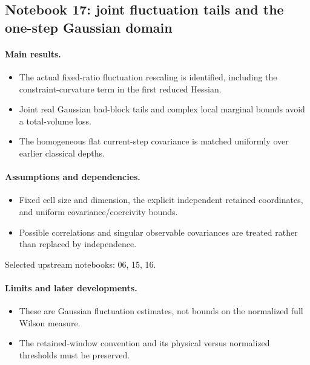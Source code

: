 \documentclass[11pt]{article}
\theoremstyle{remark}
\begin{document}
\subsection{Notebook 17: joint fluctuation tails and the one-step Gaussian domain}
\label{hnc-17}
\noindent{}\par

\paragraph{Main results.}
\begin{itemize}
\item The actual fixed-ratio fluctuation rescaling is identified, including the constraint-curvature term in the first reduced Hessian.
\item Joint real Gaussian bad-block tails and complex local marginal bounds avoid a total-volume loss.
\item The homogeneous flat current-step covariance is matched uniformly over earlier classical depths.
\end{itemize}

\paragraph{Assumptions and dependencies.}
\begin{itemize}
\item Fixed cell size and dimension, the explicit independent retained coordinates, and uniform covariance/coercivity bounds.
\item Possible correlations and singular observable covariances are treated rather than replaced by independence.
\end{itemize}

Selected upstream notebooks: 06, 15, 16.\par

\paragraph{Limits and later developments.}
\begin{itemize}
\item These are Gaussian fluctuation estimates, not bounds on the normalized full Wilson measure.
\item The retained-window convention and its physical versus normalized thresholds must be preserved.
\end{itemize}
\end{document}
